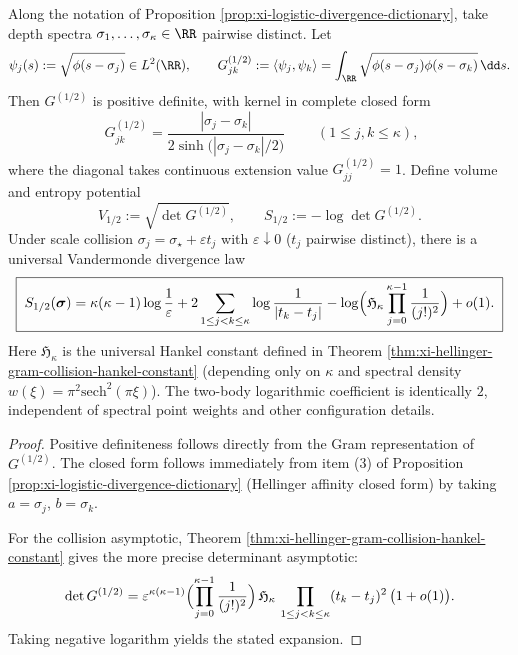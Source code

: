 \begin{proposition}\label{prop:xi-logistic-hellinger-gram-determinant}
Along the notation of Proposition \ref{prop:xi-logistic-divergence-dictionary}, take depth spectra \(\sigma_1,\dots,\sigma_\kappa\in\RR\) pairwise distinct.
Let
\[
\psi_j(s):=\sqrt{\phi(s-\sigma_j)}\in L^2(\RR),
\qquad
G^{(1/2)}_{jk}:=\langle \psi_j,\psi_k\rangle=\int_{\RR}\sqrt{\phi(s-\sigma_j)\phi(s-\sigma_k)}\,\dd s.
\]
Then \(G^{(1/2)}\) is positive definite, with kernel in complete closed form
\[
\boxed{\;
G^{(1/2)}_{jk}=\frac{|\sigma_j-\sigma_k|}{2\sinh\!\bigl(|\sigma_j-\sigma_k|/2\bigr)}\;}
\qquad(1\le j,k\le\kappa),
\]
where the diagonal takes continuous extension value \(G^{(1/2)}_{jj}=1\).
Define volume and entropy potential
\[
V_{1/2}:=\sqrt{\det G^{(1/2)}},
\qquad
S_{1/2}:=-\log\det G^{(1/2)}.
\]
Under scale collision \(\sigma_j=\sigma_\star+\varepsilon t_j\) with \(\varepsilon\downarrow 0\) (\(t_j\) pairwise distinct), there is a universal Vandermonde divergence law
\[
\boxed{\;
S_{1/2}(\boldsymbol{\sigma})
=\kappa(\kappa-1)\log\frac{1}{\varepsilon}
+2\sum_{1\le j<k\le \kappa}\log\frac{1}{|t_k-t_j|}
-\log\Bigl(\mathfrak H_\kappa\prod_{j=0}^{\kappa-1}\frac{1}{(j!)^{2}}\Bigr)
+o(1).\;}
\]
Here \(\mathfrak H_\kappa\) is the universal Hankel constant defined in Theorem \ref{thm:xi-hellinger-gram-collision-hankel-constant} (depending only on \(\kappa\) and spectral density \(w(\xi)=\pi^2\mathrm{sech}^2(\pi\xi)\)).
The two-body logarithmic coefficient is identically \(2\), independent of spectral point weights and other configuration details.
\end{proposition}
\begin{proof}
Positive definiteness follows directly from the Gram representation of \(G^{(1/2)}\).
The closed form follows immediately from item \textup{(3)} of Proposition \ref{prop:xi-logistic-divergence-dictionary} (Hellinger affinity closed form) by taking \(a=\sigma_j\), \(b=\sigma_k\).
\par
For the collision asymptotic, Theorem \ref{thm:xi-hellinger-gram-collision-hankel-constant} gives the more precise determinant asymptotic:
\[
\det G^{(1/2)}
=\varepsilon^{\kappa(\kappa-1)}
\Bigl(\prod_{j=0}^{\kappa-1}\frac{1}{(j!)^{2}}\Bigr)\,
\mathfrak H_\kappa\,
\prod_{1\le j<k\le\kappa}(t_k-t_j)^{2}\,\bigl(1+o(1)\bigr).
\]
Taking negative logarithm yields the stated expansion.
\end{proof}

